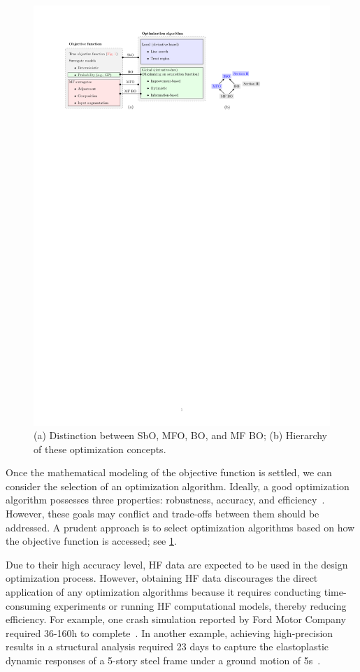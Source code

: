 \documentclass[iicol,sn-basic]{sn-jnl}%
\begin{document}
\begin{figure}
	\centering
	\includegraphics[scale=0.82]{Fig2.pdf}
	\caption{(a) Distinction between SbO, MFO, BO, and MF BO; (b) Hierarchy of these optimization concepts.}
	\label{Fig-2}
\end{figure}

Once the mathematical modeling of the objective function is settled, we can consider the selection of an optimization algorithm.
Ideally, a good optimization algorithm possesses three properties: robustness, accuracy, and efficiency~\citep{Nocedal2006}.
However, these goals may conflict and trade-offs between them should be addressed.
A prudent approach is to select optimization algorithms based on how the objective function is accessed; see \cref{Fig-2}.

Due to their high accuracy level, HF data are expected to be used in the design optimization process.
However, obtaining HF data discourages the direct application of any optimization algorithms because it requires conducting time-consuming experiments or running HF computational models, thereby reducing efficiency.
For example, one crash simulation reported by Ford Motor Company required 36-160h to complete~\citep{Wang2006}.
In another example, achieving high-precision results in a structural analysis required 23 days to capture the elastoplastic dynamic responses of a 5-story steel frame under a ground motion of 5s~\citep{Ohsaki2009}.  
\end{document}
